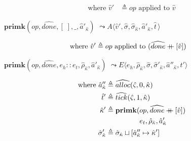 \documentclass[12pt,draft]{article}
\newcommand\mdoubleplus{\ensuremath{\mathbin{+\mkern-9mu+}}}
\begin{document}
\begin{multicols*}{2}
\begin{center}
\end{center}
\vspace{-7mm}
\begin{align*}
\text{where } \hat{v}' &\triangleq op \text{ applied to } \hat{v}
\end{align*}
\begin{center}
  $\textbf{primk}(op, \widehat{done}, [\;], \_, \hat{a}'_{\hat{\kappa}})$
  $\leadsto A\langle \hat{v}' , \hat{\sigma} , \hat{\sigma}_{\hat{\kappa}} , \hat{a}'_{\hat{\kappa}} , \hat{t}\,\rangle$
\end{center}
\vspace{-7mm}
\begin{align*}
\text{where } \hat{v}' &\triangleq op \text{ applied to } (\widehat{done} \mdoubleplus [\hat{v}])
\end{align*}
\begin{center}
  $\textbf{primk}(op, \widehat{done}, e_h::e_t, \hat{\rho}_{\hat{\kappa}}, \hat{a}'_{\hat{\kappa}})$
  $\leadsto E\langle e_h , \hat{\rho}_{\hat{\kappa}} , \hat{\sigma} , \hat{\sigma}'_{\hat{\kappa}} , \hat{a}''_{\hat{\kappa}} , \hat{t}'\rangle$
\end{center}
\vspace{-7mm}
\begin{align*}
  \text{where } \hat{a}''_{\hat{\kappa}} &\triangleq \widehat{alloc}(\hat{\varsigma}, 0, \hat{\kappa}) \\
  \hat{t}' &\triangleq \widehat{tick}(\hat{\varsigma}, 1, \hat{\kappa}) \\
  \hat{\kappa}' &\triangleq \textbf{primk}(op, \widehat{done} \mdoubleplus [\hat{v}]) \\
  &\;\;\;\;\;\;\;\;\;\;\;\;\;\;\;\;\; e_t, \hat{\rho}_{\hat{\kappa}} , \hat{a}'_{\hat{\kappa}} \\
  \hat{\sigma}'_{\hat{\kappa}} &\triangleq \hat{\sigma}_{\hat{\kappa}} \sqcup [\hat{a}''_{\hat{\kappa}} \mapsto \hat{\kappa}']
\end{align*}
\end{multicols*}


\newpage
\end{document}
